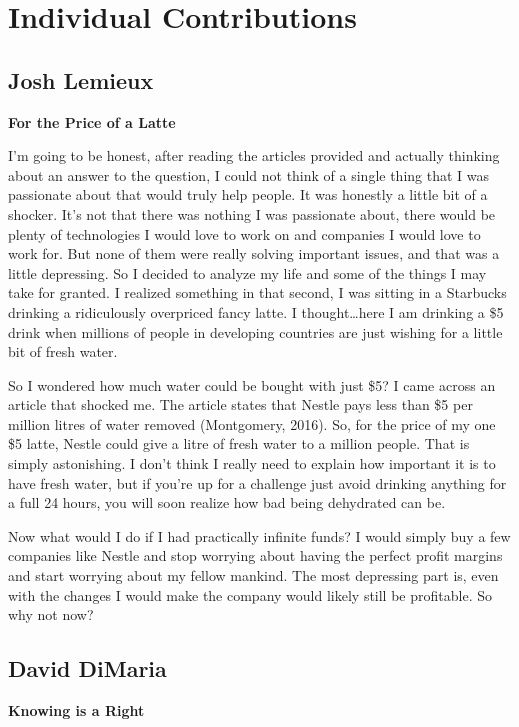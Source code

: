 \documentclass[12pt,letterpaper]{article}
\begin{document}
\clearpage
\section{Individual Contributions}
\subsection{Josh Lemieux}
\textbf{For the Price of a Latte}\par
I'm going to be honest, after reading the articles provided and actually thinking about an answer to the question, I could not think of a single thing that I was passionate about that would truly help people. It was honestly a little bit of a shocker. It's not that there was nothing I was passionate about, there would be plenty of technologies I would love to work on and companies I would love to work for. But none of them were really solving important issues, and that was a little depressing. So I decided to analyze my life and some of the things I may take for granted. I realized something in that second, I was sitting in a Starbucks drinking a ridiculously overpriced fancy latte. I thought\ldots here I am drinking a \$5 drink when millions of people in developing countries are just wishing for a little bit of fresh water.\par
So I wondered how much water could be bought with just \$5? I came across an article that shocked me. The article states that Nestle pays less than \$5 per million litres of water removed (Montgomery, 2016). So, for the price of my one \$5 latte, Nestle could give a litre of fresh water to a million people. That is simply astonishing. I don't think I really need to explain how important it is to have fresh water, but if you're up for a challenge just avoid drinking anything for a full 24 hours, you will soon realize how bad being dehydrated can be.\par
Now what would I do if I had practically infinite funds? I would simply buy a few companies like Nestle and stop worrying about having the perfect profit margins and start worrying about my fellow mankind. The most depressing part is, even with the changes I would make the company would likely still be profitable. So why not now?



\clearpage
\subsection{David DiMaria}
\textbf{Knowing is a Right}
\end{document}
